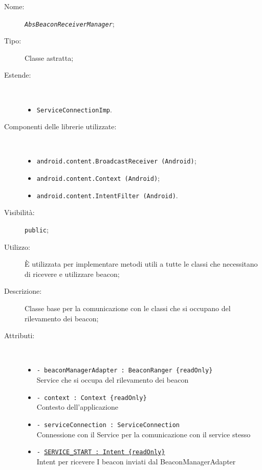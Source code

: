 \documentclass[../DefinizioneDiProdotto.tex]{subfiles}
\begin{document}
    \begin{description}
\item[Nome:] \texttt{\textit{AbsBeaconReceiverManager}};
\item[Tipo:] Classe astratta;
\item[Estende:] \
\begin{itemize}
\item \texttt{ServiceConnectionImp}.
\end{itemize}
\item[Componenti delle librerie utilizzate:] \
\begin{itemize}
\item \texttt{android.content.BroadcastReceiver (Android)};

\item \texttt{android.content.Context (Android)};

\item \texttt{android.content.IntentFilter (Android)}.

\end{itemize}
\item[Visibilità:] \texttt{public};
\item[Utilizzo:] È utilizzata per implementare metodi utili a tutte le classi che necessitano di ricevere e utilizzare beacon;
\item[Descrizione:] Classe base per la comunicazione con le classi che si occupano del rilevamento dei beacon;
\item[Attributi:] \
\begin{itemize}
\item \texttt{- beaconManagerAdapter : BeaconRanger \{readOnly\}}\\
Service che si occupa del rilevamento dei beacon

\item \texttt{- context : Context \{readOnly\}}\\
Contesto dell'applicazione

\item \texttt{- serviceConnection : ServiceConnection}\\
Connessione con il Service per la comunicazione con il service stesso

\item \texttt{- \underline{SERVICE\_START : Intent \{readOnly\}}}\\
Intent per ricevere I beacon inviati dal BeaconManagerAdapter


\end{itemize}
\end{description}
\end{document}
